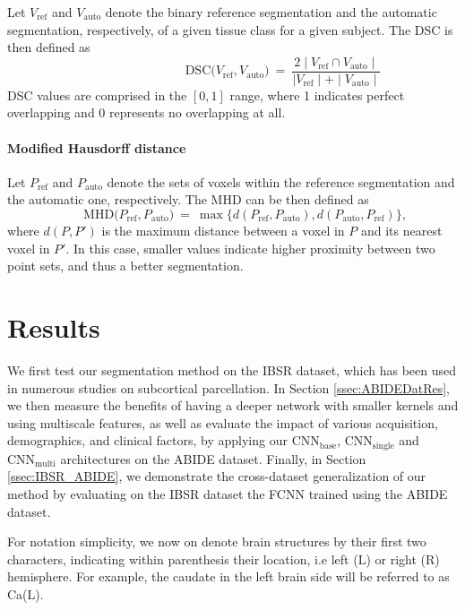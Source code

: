 \documentclass[twoside,fleqn,espcrc2]{elsarticle}
\newcommand{\CNNbase}{\mr{CNN}_\mr{base}}
\newcommand{\CNNsingle}{\mr{CNN}_\mr{single}}
\newcommand{\CNNmulti}{\mr{CNN}_\mr{multi}}
\newcommand{\mr}[1]{\mathrm{#1}}
\begin{document}
Let $V_\mr{ref}$ and $V_\mr{auto}$ denote the binary reference segmentation and the automatic segmentation, respectively, of a given tissue class for a given subject. The DSC is then defined as
\begin{equation}
	\qquad \qquad \qquad \qquad 
	    \mr{DSC}\big(V_\mr{ref}, V_\mr{auto} \big) \ = \ \frac{2 \mid V_\mr{ref} \cap V_\mr{auto}\mid} {\mid V_\mr{ref}\mid +\mid V_\mr{auto}\mid}
\end{equation}
DSC values are comprised in the $[0,1]$ range, where 1 indicates perfect overlapping and 0 represents no overlapping at all.

\paragraph{\textbf{Modified Hausdorff distance}}

Let $P_\mr{ref}$ and $P_\mr{auto}$ denote the sets of voxels within the reference segmentation and the automatic one, respectively. The MHD can be then defined as
\begin{equation}
	\qquad  \mr{MHD}\big(P_\mr{ref}, P_\mr{auto} \big) \ = \ 
	    \max \Big\{ d(P_\mr{ref},P_\mr{auto}), d(P_\mr{auto},P_\mr{ref}) \Big\},
\end{equation}
where $d(P,P')$ is the maximum distance between a voxel in $P$ and its nearest voxel in $P'$. In this case, smaller values indicate higher proximity between two point sets, and thus a better segmentation.

\section{Results}
\label{ssec:results}

We first test our segmentation method on the IBSR dataset, which has been used in numerous studies on subcortical parcellation. In Section \ref{ssec:ABIDEDatRes}, we then measure the benefits of having a deeper network with smaller kernels and using multiscale features, as well as evaluate the impact of various acquisition, demographics, and clinical factors, by applying our $\CNNbase$, $\CNNsingle$ and $\CNNmulti$ architectures on the ABIDE dataset. Finally, in Section \ref{ssec:IBSR_ABIDE}, we demonstrate the cross-dataset generalization  of our method by evaluating on the IBSR dataset the FCNN trained using the ABIDE dataset.

For notation simplicity, we now on denote brain structures by their first two characters, indicating within parenthesis their location, i.e left (L) or right (R) hemisphere. For example, the caudate in the left brain side will be referred to as Ca(L).
\end{document}
